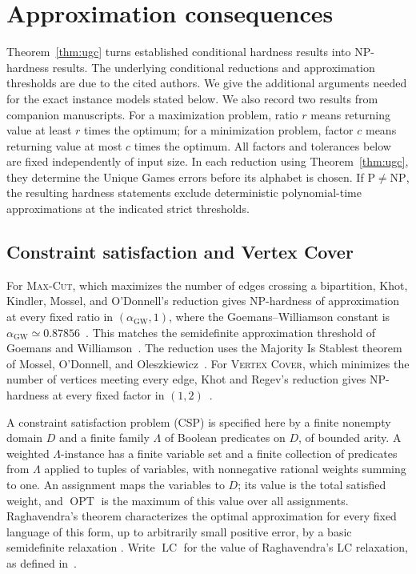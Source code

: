 \section{Approximation consequences}\label{sec:consequences}

Theorem~\ref{thm:ugc} turns established conditional hardness results
into NP-hardness results. The underlying conditional reductions and
approximation thresholds are due to the cited authors. We give the
additional arguments needed for the exact instance models stated below.
We also record two results from companion
manuscripts. For a maximization problem, ratio
\(r\) means returning value at least \(r\) times the optimum; for a
minimization problem, factor \(c\) means returning value at most \(c\)
times the optimum.
All factors and tolerances below are fixed independently of input size.
In each reduction using Theorem~\ref{thm:ugc}, they determine the
Unique Games errors before its alphabet is chosen. If
\(\mathrm P\ne\mathrm{NP}\), the resulting hardness statements exclude
deterministic polynomial-time approximations at the indicated strict
thresholds.

\subsection{Constraint satisfaction and Vertex Cover}

For \textsc{Max-Cut}, which maximizes the number of edges crossing a
bipartition, Khot, Kindler, Mossel, and O'Donnell's reduction gives
NP-hardness of approximation at every fixed ratio in
\((\alpha_{\mathrm{GW}},1)\), where the Goemans--Williamson constant is
\(\alpha_{\mathrm{GW}}\simeq0.87856\)~\cite[Theorem~1]{KKMO07}.
This matches the semidefinite approximation threshold of Goemans and
Williamson~\cite{GW95}. The reduction uses the Majority Is Stablest
theorem of Mossel, O'Donnell, and Oleszkiewicz~\cite{MOO10}.
For \textsc{Vertex Cover}, which minimizes the number of vertices
meeting every edge, Khot and Regev's reduction gives NP-hardness at
every fixed factor in \((1,2)\)~\cite{KhotRegev2008}.

A constraint satisfaction problem (CSP) is specified here by a finite
nonempty domain \(D\) and a finite family \(\Lambda\) of Boolean
predicates on \(D\), of bounded arity. A weighted \(\Lambda\)-instance
has a finite variable set and a finite collection of predicates from
\(\Lambda\) applied to tuples of variables, with nonnegative rational
weights summing to one. An assignment maps the variables to \(D\);
its value is the total satisfied weight, and \(\operatorname{OPT}\)
is the maximum of this value over all assignments.
Raghavendra's theorem characterizes the optimal approximation
for every fixed language of this form, up to arbitrarily small positive
error, by a basic semidefinite relaxation
\cite[Theorem~1.1 and Corollary~1.3]{Raghavendra08}.
Write \(\operatorname{LC}\) for the value of Raghavendra's LC relaxation,
as defined in~\cite[Section~4.5]{RaghavendraThesis09}.

